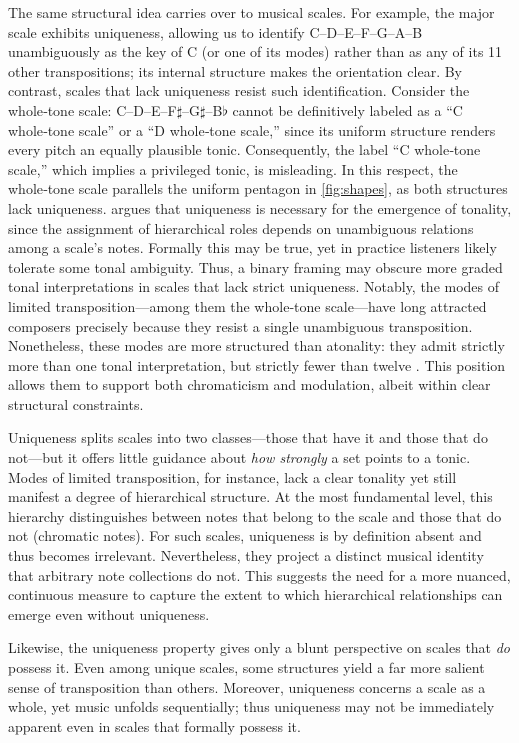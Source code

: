 \documentclass[10pt,twocolumn]{article}
\numberwithin{equation}{section} %
\begin{document}
    The same structural idea carries over to musical scales.
    For example, the major scale exhibits uniqueness, allowing us to identify C–D–E–F–G–A–B unambiguously as the key of C (or one of its modes) rather than as any of its 11 other transpositions; its internal structure makes the orientation clear.
    By contrast, scales that lack uniqueness resist such identification.
    Consider the whole‑tone scale: C–D–E–F$\sharp$–G$\sharp$–B$\flat$ cannot be definitively labeled as a “C whole‑tone scale” or a “D whole‑tone scale,” since its uniform structure renders every pitch an equally plausible tonic.
    Consequently, the label “C whole‑tone scale,” which implies a privileged tonic, is misleading.
    In this respect, the whole‑tone scale parallels the uniform pentagon in \autoref{fig:shapes}, as both structures lack uniqueness.
    \citet{Balzano1982} argues that uniqueness is necessary for the emergence of tonality, since the assignment of hierarchical roles depends on unambiguous relations among a scale’s notes.
    Formally this may be true, yet in practice listeners likely tolerate some tonal ambiguity.
    Thus, a binary framing may obscure more graded tonal interpretations in scales that lack strict uniqueness.
    Notably, the modes of limited transposition—among them the whole‑tone scale—have long attracted composers precisely because they resist a single unambiguous transposition.
    Nonetheless, these modes are more structured than atonality: they admit strictly more than one tonal interpretation, but strictly fewer than twelve \citep{Messiaen1944}.
    This position allows them to support both chromaticism and modulation, albeit within clear structural constraints.

    Uniqueness splits scales into two classes—those that have it and those that do not—but it offers little guidance about \emph{how strongly} a set points to a tonic.
    Modes of limited transposition, for instance, lack a clear tonality yet still manifest a degree of hierarchical structure.
    At the most fundamental level, this hierarchy distinguishes between notes that belong to the scale and those that do not (chromatic notes).
    For such scales, uniqueness is by definition absent and thus becomes irrelevant.
    Nevertheless, they project a distinct musical identity that arbitrary note collections do not.
    This suggests the need for a more nuanced, continuous measure to capture the extent to which hierarchical relationships can emerge even without uniqueness.

    Likewise, the uniqueness property gives only a blunt perspective on scales that \emph{do} possess it.
    Even among unique scales, some structures yield a far more salient sense of transposition than others.
    Moreover, uniqueness concerns a scale as a whole, yet music unfolds sequentially; thus uniqueness may not be immediately apparent even in scales that formally possess it.
\end{document}
